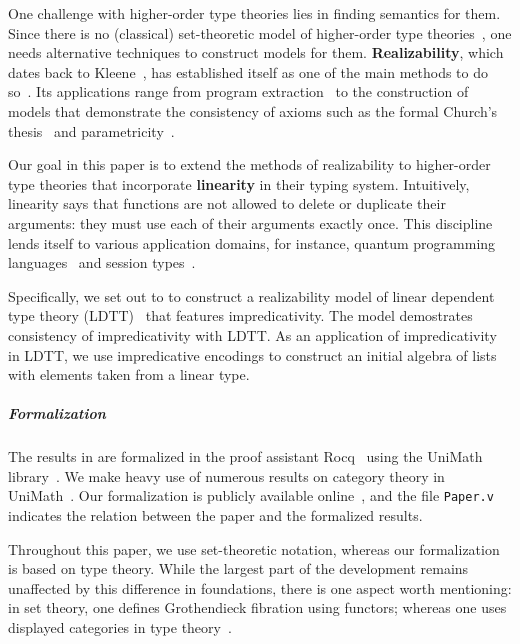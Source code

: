 \documentclass[a4paper,UKenglish,cleveref,numberwithinsect, autoref, thm-restate]{lipics-v2021}
\begin{document}
One challenge with higher-order type theories lies in finding semantics for them.
Since there is no (classical) set-theoretic model of higher-order type theories~\cite{reynolds:1984},
one needs alternative techniques to construct models for them.
\textbf{Realizability},
which dates back to Kleene~\cite{kleene:1945},
has established itself as one of the main methods to  do so~\cite{streicher:1991}.
Its applications range from program extraction~\cite{paulin-mohring:1989} to the construction of models that demonstrate the consistency of axioms
such as the formal Church's thesis~\cite{hyland:1982,oosten:2008}
and parametricity~\cite{krishnaswami:2013}.

Our goal in this paper is to extend the methods of realizability to higher-order type theories that incorporate \textbf{linearity} in their typing system.
Intuitively,
linearity says that functions are not allowed to delete or duplicate their arguments: 
they must use each of their arguments exactly once.
This discipline lends itself to various application domains,
for instance,
quantum programming languages~\cite{fu:2022}
and session types~\cite{DBLP:journals/pacmpl/ThiemannV20}.

Specifically,
we set out to to construct a realizability model of linear dependent type theory (LDTT)~\cite{cervesato1996linear,MR1946180,DBLP:conf/popl/KrishnaswamiPB15,vakar:2015,Vakar2017,lundfall:2017,Lundfall2018DiagramModel} that features impredicativity.
The model demostrates consistency of impredicativity with LDTT.
As an application of impredicativity in LDTT,
we use impredicative encodings
to construct an initial algebra of lists with elements taken from a linear type.

\subparagraph*{Formalization}
The results in 
are formalized in the proof assistant Rocq~\cite{therocqdevelopmentteam:2025} using the UniMath library~\cite{unimath}.
We make heavy use of numerous results on category theory in UniMath~\cite{ahrens:2015,ahrens:2024a,wullaert:2022}.
Our formalization is publicly available online~\cite{linear-realizability-code},
and the file \texttt{Paper.v} indicates the relation between the paper and the formalized results.

Throughout this paper,
we use set-theoretic notation,
whereas our formalization is based on type theory.
While the largest part of the development remains unaffected by this difference in foundations,
there is one aspect worth mentioning:
in set theory, one defines Grothendieck fibration using functors;
whereas one uses displayed categories in type theory~\cite{ahrens:2019a}.
\end{document}

